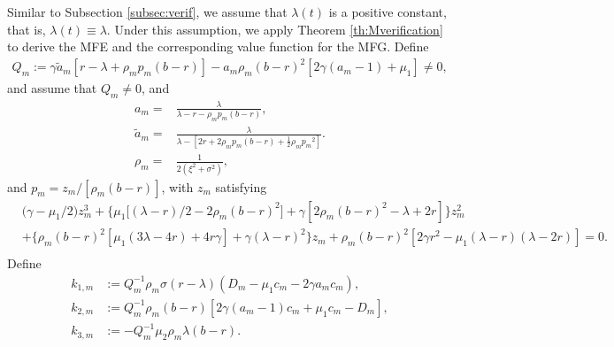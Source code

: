 \documentclass[11pt]{article}
\numberwithin{equation}{section}
\begin{document}
	Similar to Subsection \ref{subsec:verif}, we assume that $\lambda(t)$ is a positive constant, that is, $\lambda(t) \equiv \lambda$. Under this assumption, we apply Theorem \ref{th:Mverification} to derive the MFE and the corresponding value function for the MFG.
	Define
	\begin{align}
		Q_{\scriptscriptstyle m}:=\gamma \tilde{a}_{\scriptscriptstyle m}[r-\lambda+\rho_{\scriptscriptstyle m} p_{\scriptscriptstyle m}(b-r)]-a_{\scriptscriptstyle m}\rho_{\scriptscriptstyle m}(b-r)^2[2\gamma(a_{\scriptscriptstyle m}-1)+\mu_{1}]\neq 0,\label{eq:MFQ}
		\end{align}
	and assume that \(Q_{\scriptscriptstyle m} \neq 0\), and
	\begin{align}
		a_{\scriptscriptstyle m}=&\frac{\lambda}{\lambda-r-\rho_{\scriptscriptstyle m} p_{\scriptscriptstyle m}(b-r)},\label{eq:MFa1}\\
		 \tilde{a}_{\scriptscriptstyle m}=&\frac{\lambda }{\lambda-[2r+2\rho_{\scriptscriptstyle m} p_{\scriptscriptstyle m}(b-r)+\frac{1}{2}\rho_{\scriptscriptstyle m} {p_{\scriptscriptstyle m}}^2]}.\label{eq:MFbara}\\
		\rho_{\scriptscriptstyle m}=&\frac{1}{2(\xi^2+\sigma^2)}, \label{eq:MFrho}
	\end{align}
	and	 \(p_{\scriptscriptstyle m}=z_{\scriptscriptstyle m}/[\rho_{\scriptscriptstyle m}(b-r)]\), with \(z_{\scriptscriptstyle m}\) satisfying
	\begin{align}	
		&\big(\gamma-\mu_{1}/2\big){z^3_{\scriptscriptstyle m}}+\big\{\mu_{1}\big[ (\lambda-r)/2-2\rho_{\scriptscriptstyle m}(b-r)^2\big]+\gamma[2\rho_{\scriptscriptstyle m}(b-r)^2-\lambda+2r]\big\}{z^2_{\scriptscriptstyle m}}\\
		&+\{\rho_{\scriptscriptstyle m}(b-r)^2[\mu_{1}(3\lambda-4r)+4r\gamma]+\gamma(\lambda-r)^2\}z_{\scriptscriptstyle m}+\rho_{\scriptscriptstyle m}(b-r)^2[2\gamma r^2-\mu_{1}(\lambda-r)(\lambda-2r)]=0.\\\label{eq:MF-p1}
	\end{align}	
	Define
	\begin{align}
		k_{1,\scriptscriptstyle m}&:={Q^{-1}_{\scriptscriptstyle m}}\rho_{\scriptscriptstyle m}\sigma(r-\lambda)(D_{\scriptscriptstyle m}-\mu_{1}c_{\scriptscriptstyle m}-2\gamma a_{\scriptscriptstyle m}c_{\scriptscriptstyle m}),\label{eq:MFk1}\\	
		k_{2,\scriptscriptstyle m}&:={Q^{-1}_{\scriptscriptstyle m}}\rho_{\scriptscriptstyle m} (b -r)[2\gamma (a_{\scriptscriptstyle m} -1)c_{\scriptscriptstyle m} +\mu_{1}c_{\scriptscriptstyle m} -D_{\scriptscriptstyle m} ],\label{eq:MFk2}\\
		k_{3,\scriptscriptstyle m}&:=-{Q^{-1}_{\scriptscriptstyle m}}\mu_{2}\rho_{\scriptscriptstyle m} \lambda(b -r).\label{eq:MFk3}
	\end{align}
\end{document}
